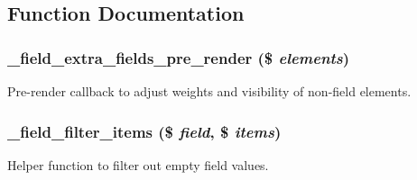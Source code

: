 \subsection{Function Documentation}
\hypertarget{group__field_gaf9008661a037c20fca58ad9738495325}{
\subsubsection[{\_\-field\_\-extra\_\-fields\_\-pre\_\-render}]{\setlength{\rightskip}{0pt plus 5cm}\_\-field\_\-extra\_\-fields\_\-pre\_\-render (\$ {\em elements})}}
\label{group__field_gaf9008661a037c20fca58ad9738495325}
Pre-\/render callback to adjust weights and visibility of non-\/field elements. \hypertarget{group__field_gabff946d3aa40a032f913ad2f336cbd05}{
\subsubsection[{\_\-field\_\-filter\_\-items}]{\setlength{\rightskip}{0pt plus 5cm}\_\-field\_\-filter\_\-items (\$ {\em field}, \/  \$ {\em items})}}
\label{group__field_gabff946d3aa40a032f913ad2f336cbd05}
Helper function to filter out empty field values.


